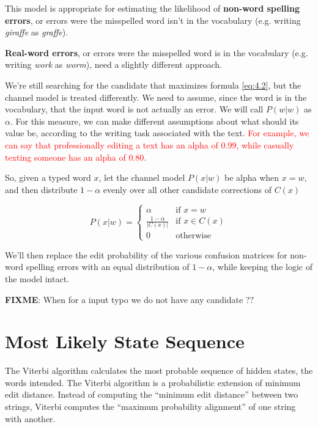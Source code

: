 This model is appropriate for estimating the likelihood of \textbf{non-word spelling errors}, or errors were the 
misspelled word isn't in the vocabulary (e.g. writing \textsl{giraffe} as \textsl{graffe}).

\textbf{Real-word errors}, or errors were the misspelled word is in the vocabulary (e.g. writing \textsl{work}  as  
\textsl{worm}), need a slightly different approach.

We're still searching for the candidate that maximizes formula \ref{eq:4.2}, but the channel model is treated 
differently. 
We need to assume, since the word is in the vocabulary, that the input word is not actually an error. We will call 
$P(w|w)$ as $\alpha$. For this measure, we can make different assumptions about what should its value be, 
according to the writing task associated with the text. \textcolor{red}{For example, we can say that 
professionally editing a text has an alpha of $0.99$, while casually texting someone has an alpha of $0.80$.}

So, given a typed word $x$, let the channel model $P(x|w)$ be alpha when $x = w$, and then distribute 
$1-\alpha $ evenly over all other candidate corrections of $C(x)$ 

\begin{equation}\label{eq:4.3}
	P(x|w) = \begin{cases} 
	\alpha & \mbox{if } x = w \\ 
	\frac{1-\alpha}{|C(x)|} & \mbox{if }  x \in C(x) \\
	0 & \mbox{otherwise} 
	\end{cases}
\end{equation}

We'll then replace the edit probability of the various confusion matrices for non-word spelling errors with an 
equal distribution of $1-\alpha$, while keeping the logic of the model intact.

\textbf{FIXME}: When for a input typo we do not have any candidate ?? 

\section{Most Likely State Sequence}

The Viterbi algorithm calculates the most probable sequence of hidden states, the words intended.
The Viterbi algorithm is a probabilistic extension of minimum edit distance. Instead of computing the “minimum 
edit distance” between two strings, Viterbi computes the “maximum probability alignment” of one string with 
another. 


